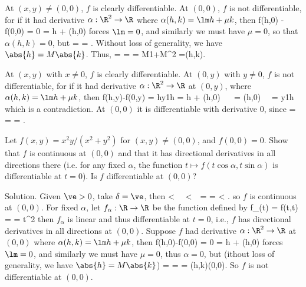 \item [(iv)] At $(x,y)\neq (0,0)$, $f$ is clearly differentiable. At $(0,0)$, $f$ is not differentiable, for if it had derivative $\alpha:\R^2\to \R$ where $\alpha(h,k)=\lm h + \mu k$, then
\be
f(h,0) - f(0,0) = 0 = \lm h + \epsilon(h,0)
\ee
forces $\lm = 0$, and similarly we must have $\mu = 0$, so that $\alpha(h,k)=0$, but
\be
{} =  = .
\ee
Without loss of generality, we have $\abs{h}= M\abs{k}$. Thus,
\be
{} =  =  = \frac M{1+M^2} =\alpha(h,k).
\ee
\item [(v)] At $(x,y)$ with $x\neq 0$, $f$ is clearly differentiable. At $(0,y)$ with $y \neq 0$, $f$ is not differentiable, for if it had derivative $\alpha:\R^2\to\R$ at $(0,y)$, where $\alpha(h,k)= \lm h + \mu k$, then
\be
f(h,y)-f(0,y) = hy\sin \tfrac 1h = \lm h + \epsilon(h,0) \ \ra \  = \epsilon(h,0) \ \ra \ \lm = y\sin\tfrac 1h
\ee
which is a contradiction. At $(0,0)$ it is differentiable with derivative 0, since
\be
{} =  \leq {} =  \leq {}  =   .
\ee
\een

\begin{exercise}
Let $f(x, y) = x^2y/(x^2 + y^2)$ for $(x, y) \neq (0, 0)$, and $f(0, 0) = 0$. Show that $f$ is continuous at $(0, 0)$ and that it has directional derivatives in all directions there (i.e. for any fixed $\alpha$, the function $t \mapsto f(t \cos \alpha, t \sin \alpha )$ is differentiable at $t = 0$). Is $f$ differentiable at $(0, 0)$?
\end{exercise}

Solution. Given $\ve>0$, take $\delta = \ve$, then
\be
{} < \delta \ \ra \ <\ve \ \ra \ =  \leq {} = < \ve.
\ee
so $f$ is continuous at $(0,0)$. For fixed $\alpha$, let $f_\alpha:\R\to\R$ be the function defined by 
\be
f_\alpha(t) = f(t\cos\alpha,t\sin \alpha) =  = t\cos^2\alpha\sin\alpha
\ee
then $f_\alpha$ is linear and thus differentiable at $t=0$, i.e., $f$ has directional derivatives in all directions at $(0,0)$. Suppose $f$ had derivative $\alpha:\R^2\to \R$ at $(0,0)$ where $\alpha(h,k) = \lm h + \mu k$, then
\be
f(h,0)-f(0,0) = 0 = \lm h + \epsilon(h,0)
\ee
forces $\lm = 0$, and similarly we must have $\mu = 0$, thus $\alpha = 0$, but (ithout loss of generality, we have $\abs{h}= M\abs{k}$)
\be
{} =  =  =   \quad{}(h,k)\to (0,0).
\ee
So $f$ is not differentiable at $(0,0)$.

